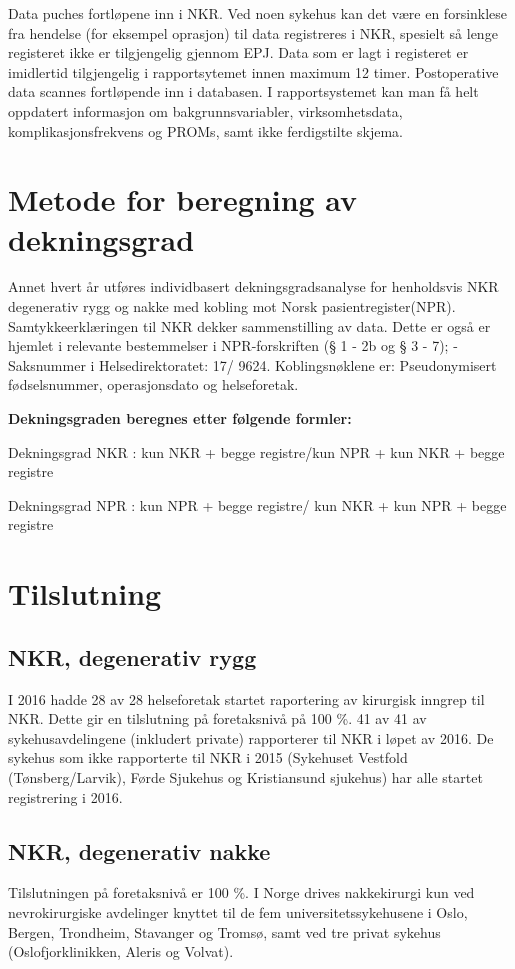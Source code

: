 \documentclass[norsk, a4paper, twocolumn]{report}
\begin{document}
Data puches fortløpene inn i NKR. Ved noen sykehus kan det være en forsinklese fra hendelse (for eksempel oprasjon) til data registreres i NKR, spesielt så lenge registeret ikke er tilgjengelig gjennom EPJ. Data som er lagt i registeret er imidlertid tilgjengelig i rapportsytemet innen maximum 12 timer. Postoperative data scannes fortløpende inn i databasen. I rapportsystemet kan man få helt oppdatert informasjon om bakgrunnsvariabler, virksomhetsdata, komplikasjonsfrekvens og PROMs, samt ikke ferdigstilte skjema.
\section{Metode for beregning av dekningsgrad}\label{sec:met}

Annet hvert år utføres individbasert dekningsgradsanalyse for henholdsvis NKR degenerativ rygg og nakke med kobling mot Norsk pasientregister(NPR).
Samtykkeerklæringen til NKR dekker  sammenstilling av data. Dette er også er hjemlet i relevante bestemmelser i NPR-forskriften (§ 1 - 2b og § 3 - 7); - Saksnummer i Helsedirektoratet: 17/ 9624. Koblingsnøklene er: Pseudonymisert fødselsnummer, operasjonsdato og helseforetak.

\textbf{Dekningsgraden beregnes etter følgende formler:}

Dekningsgrad NKR : kun NKR + begge registre/kun NPR + kun NKR + begge registre

Dekningsgrad NPR : kun NPR + begge registre/ kun NKR + kun NPR + begge registre

\section{Tilslutning}\label{sec:endek}

\subsection{NKR, degenerativ rygg}
I 2016 hadde 28 av 28 helseforetak startet raportering av kirurgisk inngrep til NKR. Dette gir en tilslutning på foretaksnivå på 100 \%. 41 av 41 av sykehusavdelingene (inkludert private) rapporterer til NKR i løpet av 2016. De sykehus som ikke rapporterte til NKR  i 2015 (Sykehuset Vestfold (Tønsberg/Larvik), Førde Sjukehus og Kristiansund sjukehus) har alle startet registrering i 2016.

\subsection{NKR, degenerativ nakke}
Tilslutningen på foretaksnivå er 100 \%.  I Norge drives nakkekirurgi kun ved nevrokirurgiske avdelinger knyttet til de fem universitetssykehusene i Oslo, Bergen, Trondheim, Stavanger og Tromsø, samt ved tre privat sykehus (Oslofjorklinikken, Aleris og Volvat). 
\end{document}
